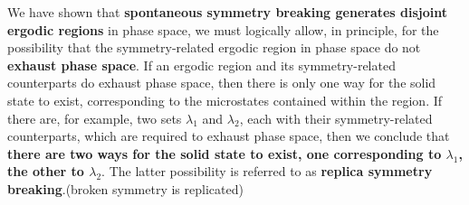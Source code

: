 \documentclass[12pt,titlepage]{article}
\numberwithin{equation}{section}
\begin{document}

We have shown that \textbf{spontaneous symmetry breaking generates disjoint ergodic regions} in phase space, we must logically allow, in principle, for the possibility that the symmetry-related ergodic region in phase space do not \textbf{exhaust phase space}. If an ergodic region and its symmetry-related counterparts do exhaust phase space, then there is only one way for the solid state to exist, corresponding to the microstates contained within the region. If there are, for example, two sets $\lambda_1$ and $\lambda_2$, each with their symmetry-related counterparts, which are required to exhaust phase space, then we conclude that \textbf{there are two ways for the solid state to exist, one corresponding to $\lambda_1$, the other to $\lambda_2$}. The latter possibility is referred to as \textbf{replica symmetry breaking}.(broken symmetry is replicated)
\end{document}

